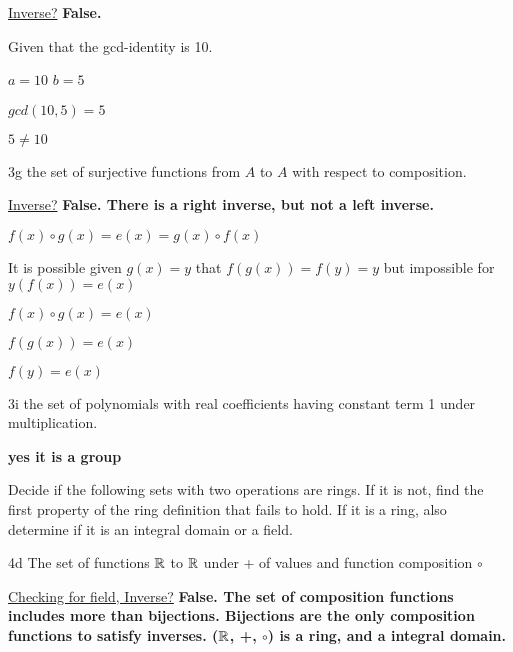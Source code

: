 \underline{Inverse?} \textbf{False.}

Given that the gcd-identity is 10.

$a=10$ $b=5$

$gcd(10,5) = 5$ 

$5 \neq 10$

\begin{question}{3g}
the set of surjective functions from $A$ to $A$ with respect to composition.
\end{question}

\underline{Inverse?} \textbf{False. There is a right inverse, but not a left inverse.}

$f(x) \circ g(x) = e(x) = g(x) \circ f(x)$

It is possible given $g(x) = y$ that $f(g(x)) = f(y) = y$ but impossible for $y(f(x)) = e(x)$

$f(x) \circ g(x) = e(x)$

$f(g(x)) = e(x)$

$f(y) = e(x)$

\begin{question}{3i}
the set of polynomials with real coefficients having constant term 1 under multiplication.
\end{question}

\textbf{yes it is a group}


\begin{question}{4}
Decide if the following sets with two operations are rings. If it is not, find the first property of the ring definition that fails to hold. If it is a ring, also determine if it is an integral domain or a field.
\end{question}

\begin{question}{4d}
The set of functions $\mathbb{R}$ to $\mathbb{R}$ under + of values and function composition $\circ$
\end{question}

\underline{Checking for field, Inverse?} \textbf{False. The set of composition functions includes more than bijections. Bijections are the only composition functions to satisfy inverses. ($\mathbb{R}$, +, $\circ$) is a ring, and a integral domain.}

